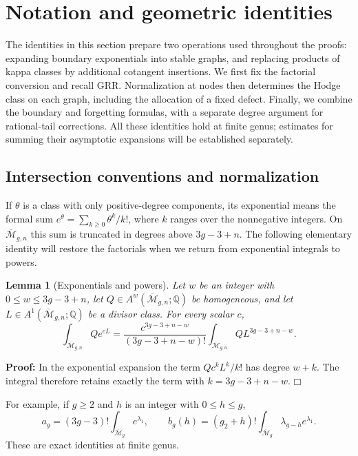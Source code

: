\documentclass[a4paper,10pt]{article}
\numberwithin{equation}{section}
\newcommand{\MM}{\overline{\mathcal{M}}}
\theoremstyle{paperplain}
\newtheorem{lmm}[thm]{Lemma}
\theoremstyle{paperremark}
\theoremstyle{paperplain}
\newenvironment{prf}{\noindent \textbf{Proof: }}{\hfill $\mdlgwhtsquare$\par\addvspace{0.5\baselineskip}}
\begin{document}
\section{Notation and geometric identities}
\label{sec:s02}

The identities in this section prepare two operations used throughout
the proofs: expanding boundary exponentials into stable graphs, and
replacing products of kappa classes by additional cotangent insertions.
We first fix the factorial conversion and recall GRR.  Normalization at
nodes then determines the Hodge class on each graph, including the
allocation of a fixed defect.  Finally, we combine the boundary and
forgetting formulas, with a separate degree argument for rational-tail
corrections.  All these identities hold at finite genus; estimates for
summing their asymptotic expansions will be established separately.

\subsection{Intersection conventions and normalization}
\label{subsec:s02:01}

If $\theta$ is a class with only positive-degree components, its
exponential means the formal sum
$e^\theta=\sum_{k\geq0}\theta^k/k!$, where $k$ ranges over the
nonnegative integers.  On $\MM_{g,n}$ this sum is truncated in degrees
above $3g-3+n$.  The following elementary identity will restore the
factorials when we return from exponential integrals to powers.

\begin{lmm}[Exponentials and powers]
\label{lmm:s02:exp-to-power}
Let $w$ be an integer with $0\leq w\leq3g-3+n$, let
$Q\in A^w(\MM_{g,n};\mathbb Q)$ be homogeneous, and let
$L\in A^1(\MM_{g,n};\mathbb Q)$ be a divisor class.  For every scalar
$c$,
\begin{equation}
\label{eq:s02:exp-to-power}
\int_{\MM_{g,n}}Qe^{cL}
=\frac{c^{3g-3+n-w}}{(3g-3+n-w)!}
  \int_{\MM_{g,n}}QL^{3g-3+n-w}.
\end{equation}
\end{lmm}

\begin{prf}
In the exponential expansion the term $Qc^kL^k/k!$ has degree $w+k$.
The integral therefore retains exactly the term with
$k=3g-3+n-w$.
\end{prf}

For example, if $g\geq2$ and $h$ is an integer with $0\leq h\leq g$,
\begin{equation}
\label{eq:s02:hodge-factorials}
a_g=(3g-3)!\int_{\MM_g}e^{\lambda_1},
\qquad
b_g(h)=(g_2+h)!\int_{\MM_g}\lambda_{g-h}e^{\lambda_1}.
\end{equation}
These are exact identities at finite genus.
\end{document}
